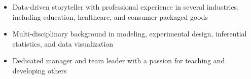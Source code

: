 \begin {cvparagraph}
\begin {itemize}
\vspace {2.0mm}
\item {Data-driven storyteller with professional experience in several industries, including education, healthcare, and consumer-packaged goods}
\item {Multi-disciplinary background in modeling, experimental design, inferential statistics, and data visualization}
\item {Dedicated manager and team leader with a passion for teaching and developing others}
\end {itemize}
\end {cvparagraph}
